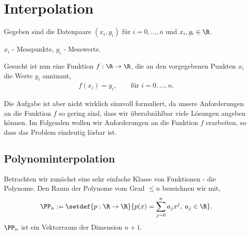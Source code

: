 \section{Interpolation}

\begin{bemn}[Interpolationsaufgabe.]
Gegeben sind die Datenpaare
 $(x_i,y_i)$ für $i=0,\ldots,n$ und $x_i,y_i\in\R$.
\begin{bspn}
$x_i$ - Messpunkte,\quad
$y_i$ - Messwerte.\bsphere
\end{bspn} 
Gesucht ist nun eine Funktion $f:\R\to\R$, die an den vorgegebenen Punkten
$x_i$ die Werte $y_i$ annimmt,
\begin{align*}
f(x_i) = y_i,\qquad\text{für } i=0,\ldots,n.
\end{align*}
\end{bemn} 
Die Aufgabe ist aber nicht wirklich sinnvoll formuliert, da unsere Anforderungen
an die Funktion $f$ so gering sind, dass wir überabzählbar viele Lösungen angeben
können. Im Folgenden wollen wir Anforderungen an die Funktion $f$
erarbeiten, so dass das Problem eindeutig lösbar ist.

\subsection{Polynominterpolation}

Betrachten wir zunächst eine sehr einfache Klasse von Funktionen - die
Polynome. Den Raum der Polynome vom Grad $\le n$ bezeichnen wir mit,
\begin{align*}
\PP_n:=\setdef{p:\R\to\R}{p(x)=\sum\limits_{j=0}^n a_j x^j,\; a_j\in\R}.
\end{align*}
$\PP_n$ ist ein Vektorraum der Dimension $n+1$.

